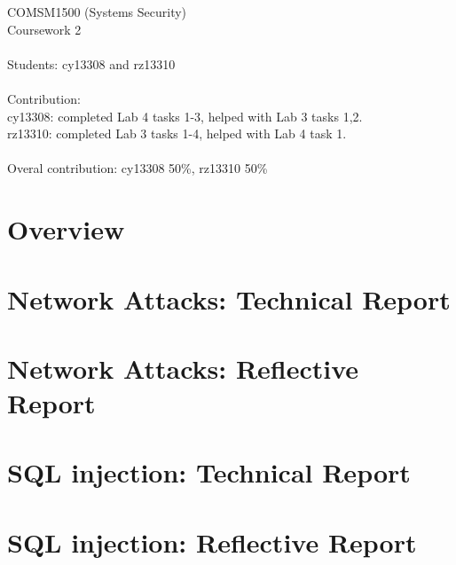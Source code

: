 \documentclass[11pt, onecolumn]{article}
\newcommand\tab[1][1cm]{\hspace*{#1}}
\begin{document}
COMSM1500 (Systems Security)\\
Coursework 2\\
\\
Students: cy13308 and rz13310 \\
\\
Contribution: \\
\tab[1cm] cy13308: completed Lab 4 tasks 1-3, helped with Lab 3 tasks 1,2.\\
\tab[1cm] rz13310: completed Lab 3 tasks 1-4, helped with Lab 4 task 1.
\\
\\
Overal contribution: cy13308 50\%, rz13310 50\%
\newpage


\section{Overview}


\newpage
\section{Network Attacks: Technical Report}


\newpage
\section{Network Attacks: Reflective Report}


\newpage
\section{SQL injection: Technical Report}


\newpage
\section{SQL injection: Reflective Report}



\newpage
{}

\end{document}
